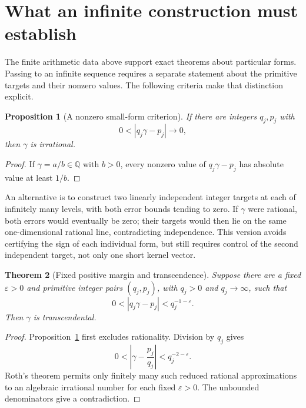 \documentclass[11pt,a4paper]{article}
\newcommand{\Q}{\mathbb Q}
\newtheorem{theorem}{Theorem}[section]
\newtheorem{proposition}[theorem]{Proposition}
\theoremstyle{definition}
\theoremstyle{remark}
\numberwithin{equation}{section}
\begin{document}
\section{What an infinite construction must establish}
\label{pm:sec:infinite-target}

The finite arithmetic data above support exact theorems about particular
forms.  Passing to an infinite sequence requires a separate statement
about the primitive targets and their nonzero values.  The following
criteria make that distinction explicit.

\begin{proposition}[A nonzero small-form criterion]\label{pm:tg:irrational}
If there are integers $q_j,p_j$ with
\[
 0<|q_j\gamma-p_j|\longrightarrow0,
\]
then $\gamma$ is irrational.
\end{proposition}
\begin{proof}
If $\gamma=a/b\in\Q$ with $b>0$, every nonzero value of
$q_j\gamma-p_j$ has absolute value at least $1/b$.
\end{proof}

An alternative is to construct two linearly independent integer targets
at each of infinitely many levels, with both error bounds tending to
zero.  If $\gamma$ were rational, both errors would eventually be zero;
their targets would then lie on the same one-dimensional rational line,
contradicting independence.  This version avoids certifying the sign of
each individual form, but still requires control of the second independent
target, not only one short kernel vector.

\begin{theorem}[Fixed positive margin and transcendence]\label{pm:tg:roth}
Suppose there are a fixed $\varepsilon>0$ and primitive integer pairs
$(q_j,p_j)$, with $q_j>0$ and $q_j\to\infty$, such that
\begin{equation}\label{pm:tg:margin}
 0<|q_j\gamma-p_j|<q_j^{-1-\varepsilon}.
\end{equation}
Then $\gamma$ is transcendental.
\end{theorem}
\begin{proof}
Proposition~\ref{pm:tg:irrational} first excludes rationality.  Division by
$q_j$ gives
\[
 0<\left|\gamma-\frac{p_j}{q_j}\right|<q_j^{-2-\varepsilon}.
\]
Roth's theorem \cite{pm:Roth1955} permits only finitely many such reduced
rational approximations to an algebraic irrational number for each fixed
$\varepsilon>0$.  The unbounded denominators give a contradiction.
\end{proof}
\end{document}
